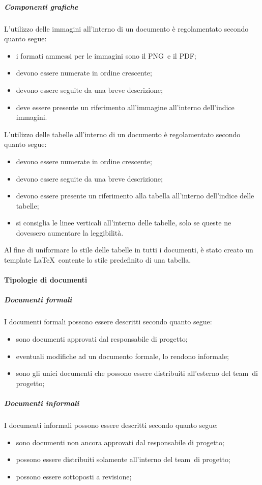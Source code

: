 \documentclass[../NormeProgetto.tex]{subfiles}
\begin{document}
		\subparagraph{Componenti grafiche}
			L'utilizzo delle immagini all'interno di un documento è regolamentato secondo quanto segue:
			\begin{itemize}
				\item i formati ammessi per le immagini sono il PNG\g\ e il PDF\g;
				\item devono essere numerate in ordine crescente;
				\item devono essere seguite da una breve descrizione;
				\item deve essere presente un riferimento all'immagine all'interno dell'indice immagini.
			\end{itemize}
			\subsubparagraph{Tabelle}
			L'utilizzo delle tabelle all'interno di un documento è regolamentato secondo quanto segue:
			\begin{itemize}
				\item devono essere numerate in ordine crescente;
				\item devono essere seguite da una breve descrizione;
				\item devono essere presente un riferimento alla tabella all'interno dell'indice delle tabelle;
				\item si consiglia le linee verticali all'interno delle tabelle, solo se queste ne dovessero aumentare la leggibilità.
			\end{itemize}
			
			Al fine di uniformare lo stile delle tabelle in tutti i documenti, è stato creato un template \LaTeX\ contente lo stile predefinito di una tabella.
	
			
	\paragraph{Tipologie di documenti}
		\subparagraph{Documenti formali}
		I documenti formali possono essere descritti secondo quanto segue:
		\begin{itemize}
			\item sono documenti approvati dal responsabile di progetto;
			\item eventuali modifiche ad un documento formale, lo rendono informale;
			\item sono gli unici documenti che possono essere distribuiti all'esterno del team\g\ di progetto;
		\end{itemize}
		
		\subparagraph{Documenti informali}
		I documenti informali possono essere descritti secondo quanto segue:
		\begin{itemize}
			\item sono documenti non ancora approvati dal responsabile di progetto;
			\item possono essere distribuiti solamente all'interno del team\g\ di progetto;
			\item possono essere sottoposti a revisione; 
		\end{itemize}
		
\end{document}
